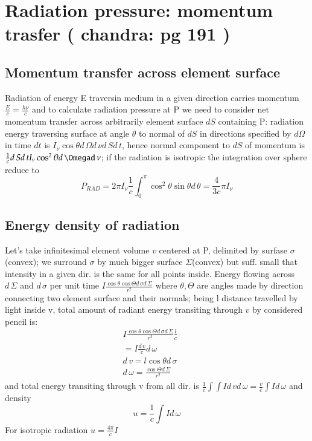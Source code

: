         \section{Radiation pressure: momentum trasfer ( chandra: pg 191 )}
            \subsection{Momentum transfer across element surface} 
                    Radiation of energy E traversin medium in a given direction carries momentum $\frac{E}{c}=\frac{h\nu}{c}$ and to calculate radiation pressure at P we need to consider net momentum transfer across arbitrarily element surface $dS$ containing P: radiation energy traversing surface at angle $\theta$ to normal of $dS$ in directions specified by $d\Omega$ in time $dt$ is $I_{\nu}\cos{\theta}d\,\Omega d\,\nu d\,Sd\,t$, hence normal component to $dS$ of momentum is $\frac{1}{c}d\,Sd\,tI_{\nu}\cos^2{\theta}d\,\Omegad\,\nu$; if the radiation is isotropic the integration over sphere reduce to
                    \begin{equation*}
                    P_{RAD}=2\pi I_{\nu}\frac{1}{c}\int_0^{\pi}\cos^2{\theta}\sin{\theta}d\,\theta=\frac{4}{3c}\pi I_{\nu}    
                    \end{equation*}
            \subsection{Energy density of radiation}
                    Let's take infinitesimal element volume $v$ centered at P, delimited by surfase $\sigma$(convex); we surround $\sigma$ by much bigger surface $\Sigma$(convex) but suff. small that intensity in a given dir. is the same for all points inside. Energy flowing across $d\,\Sigma$ and $d\,\sigma$ per unit time $I \frac{\cos{\theta}\cos{\Theta}d\,\sigma d\,\Sigma}{r^2}$ where $\theta,\Theta$ are angles made by direction connecting two element surface and their normals; being l distance travelled by light inside v, total amount of radiant energy transiting through $v$ by considered pencil is:
                    \begin{align*}
                    &I \frac{\cos{\theta}\cos{\Theta}d\,\sigma d\,\Sigma}{r^2}\frac{l}{c}\\
                    &=I \frac{d\,v}{c}d\,\omega\\
                    &d\,v=l\cos{\theta}d\,\sigma\\
                    &d\,\omega=\frac{\cos{\Theta}d\,\Sigma}{r^2}&\tag{solid angle}
                    &&\tag{subtended by $d\,\Sigma$ at P}
                    \end{align*}
                    and total energy transiting through v from all dir. is $\frac{1}{c}\int\int Id\,vd\,\omega=\frac{v}{c}\int Id\,\omega$ and density
                    \begin{equation}
                        u=\frac{1}{c}\int Id\,\omega
                    \end{equation}
                    For isotropic radiation $u=\frac{4\pi}{c}I$
